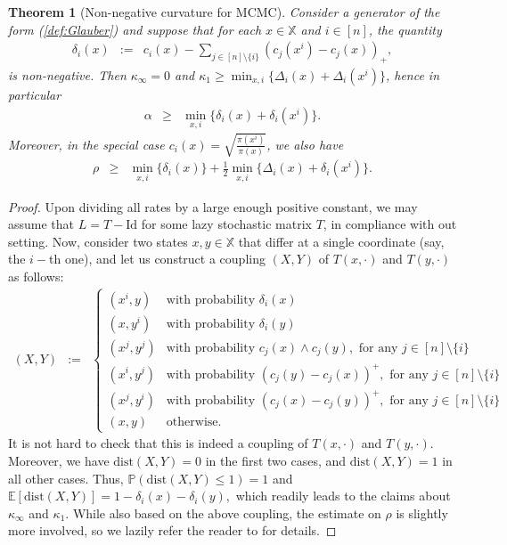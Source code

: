 \documentclass[12pt,final]{article}
\newtheorem{theorem}{Theorem}[section]
\numberwithin{equation}{section}
\newcommand{\EE}{{\mathbb{E}}}
\newcommand{\PP}{{\mathbb{P}}}
\newcommand{\dX}{\mathbb{X}}
\newcommand{\dist}{\mathrm{dist}}
\begin{document}
\begin{theorem}[Non-negative curvature for MCMC]\label{th:MCMC}Consider a generator of the form 
(\ref{def:Glauber}) and suppose that for each $x\in\dX$ and $i\in[n]$, the quantity
\begin{eqnarray*}
\delta_i(x) & := & c_i(x)-\sum_{j\in[n]\setminus\{i\}}\left(c_j(x^i)-c_j(x)\right)_+,
\end{eqnarray*}
is non-negative. Then $\kappa_\infty=0$ and $\kappa_1\ge \min_{x,i}\{\Delta_i(x)+\Delta_i(x^i)\}$, hence in particular
\begin{eqnarray*}
\alpha & \ge & \min_{x,i}\{\delta_i(x)+\delta_i(x^i)\}.
\end{eqnarray*}
Moreover, in the special case $c_i(x)=\sqrt{\frac{\pi(x^i)}{\pi(x)}}$, we also have
\begin{eqnarray*}
\rho & \ge & \min_{x,i}\{\delta_i(x)\}+\frac{1}{2}\min_{x,i}\{\Delta_i(x)+\delta_i(x^i)\}.
\end{eqnarray*}
\end{theorem}
\begin{proof}Upon dividing all rates by a large enough positive constant, we may assume that $L=T-\mathrm{Id}$ for some lazy stochastic matrix $T$, in compliance with out setting. Now, consider two states $x,y\in\dX$ that differ at a single coordinate (say, the $i-$th one), and let us construct a coupling $(X,Y)$ of  $T(x,\cdot)$ and $T(y,\cdot)$ as follows:
\begin{eqnarray*}
\left(X,Y\right) & := & \left\{
\begin{array}{ll}
(x^i,y) & \textrm{with probability }\delta_i(x)\\
(x,y^i) & \textrm{with probability }\delta_i(y)\\
 (x^j,y^j) & \textrm{with probability }c_j(x)\wedge c_j(y), \textrm{ for any }j\in[n]\setminus\{i\}\\
 (x^i,y^j) & \textrm{with probability }\left(c_j(y)-c_j(x)\right)^+, \textrm{ for any }j\in[n]\setminus\{i\}\\
 (x^j,y^i) & \textrm{with probability }\left(c_j(x)-c_j(y)\right)^+, \textrm{ for any }j\in[n]\setminus\{i\}\\
(x,y) & \textrm{otherwise}.
\end{array}
\right.
\end{eqnarray*}
It is not hard to check that this is indeed a coupling of $T(x,\cdot)$ and $T(y,\cdot)$. Moreover, we have $\dist(X,Y)=0$ in the first two cases, and $\dist(X,Y)=1$ in all other cases. Thus, $\PP(\dist(X,Y)\le 1)=1$  and 
$
\EE[\dist(X,Y)]  =  1-\delta_i(x)-\delta_i(y),
$
which readily leads to the claims about $\kappa_\infty$ and $\kappa_1$. While also based on the above coupling, the estimate on $\rho$ is slightly more involved, so we lazily refer the reader to \cite{pedrotti2023contractivecouplingratescurvature} for details.
\end{proof}
\end{document}
